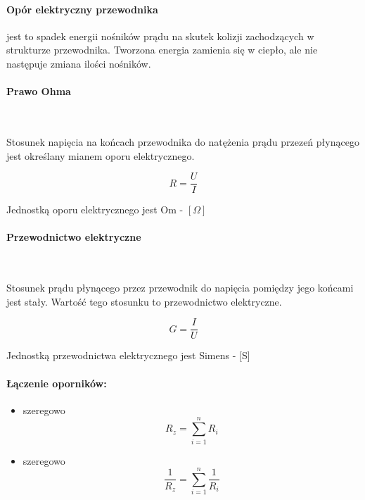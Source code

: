\documentclass{article}
\begin{document}
            \paragraph{Opór elektryczny przewodnika} jest to spadek
            energii nośników prądu na skutek kolizji zachodzących 
            w strukturze przewodnika. Tworzona energia zamienia się
            w ciepło, ale nie następuje zmiana ilości nośników.

            \paragraph{Prawo Ohma}

            \
            
            Stosunek napięcia na końcach przewodnika do natężenia
            prądu przezeń płynącego jest określany mianem oporu
            elektrycznego.

            \begin{equation}
                R = \frac{U}{I}
            \end{equation}

            Jednostką oporu elektrycznego jest Om - $[\Omega]$

            \paragraph{Przewodnictwo elektryczne}

            \
            
            Stosunek prądu płynącego przez przewodnik do napięcia
            pomiędzy jego końcami jest stały. Wartość tego stosunku
            to przewodnictwo elektryczne.

            \begin{equation}
                G = \frac{I}{U}
            \end{equation}

            Jednostką przewodnictwa elektrycznego jest Simens - [S]

            \paragraph{Łączenie oporników:}
            \begin{itemize}
                \item szeregowo
                \begin{equation}
                    R_{z} = \sum\limits_{i = 1}^n R_i
                \end{equation}

                \item szeregowo
                \begin{equation}
                    \frac{1}{R_{z}} =  \sum\limits_{i = 1}^n \frac{1}{R_i}
                \end{equation}
            \end{itemize}
            
\end{document}

